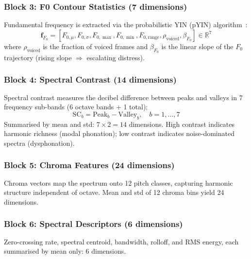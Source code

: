 \documentclass[11pt,a4paper]{article}
\begin{document}
\subsubsection{Block 3: F0 Contour Statistics (7 dimensions)}

Fundamental frequency is extracted via the probabilistic YIN
(pYIN) algorithm~\cite{mauch2014pyin}:
\begin{equation}
  \mathbf{f}_{F_0} = [F_{0,\mu}, F_{0,\sigma}, F_{0,\max}, F_{0,\min},
                       F_{0,\text{range}}, \rho_{\text{voiced}},
                       \beta_{F_0}] \in \mathbb{R}^7
\end{equation}
where $\rho_{\text{voiced}}$ is the fraction of voiced frames and
$\beta_{F_0}$ is the linear slope of the $F_0$ trajectory (rising
slope $\Rightarrow$ escalating distress).

\subsubsection{Block 4: Spectral Contrast (14 dimensions)}

Spectral contrast measures the decibel difference between peaks and
valleys in 7 frequency sub-bands (6 octave bands + 1 total):
\begin{equation}
  \text{SC}_b = \text{Peak}_b - \text{Valley}_b, \quad b = 1, \dots, 7
\end{equation}
Summarised by mean and std: $7 \times 2 = 14$ dimensions. High contrast
indicates harmonic richness (modal phonation); low contrast indicates
noise-dominated spectra (dysphonation).

\subsubsection{Block 5: Chroma Features (24 dimensions)}

Chroma vectors map the spectrum onto 12 pitch classes, capturing
harmonic structure independent of octave. Mean and std of 12 chroma
bins yield 24 dimensions.

\subsubsection{Block 6: Spectral Descriptors (6 dimensions)}

Zero-crossing rate, spectral centroid, bandwidth, rolloff, and RMS
energy, each summarised by mean only: 6 dimensions.
\end{document}
